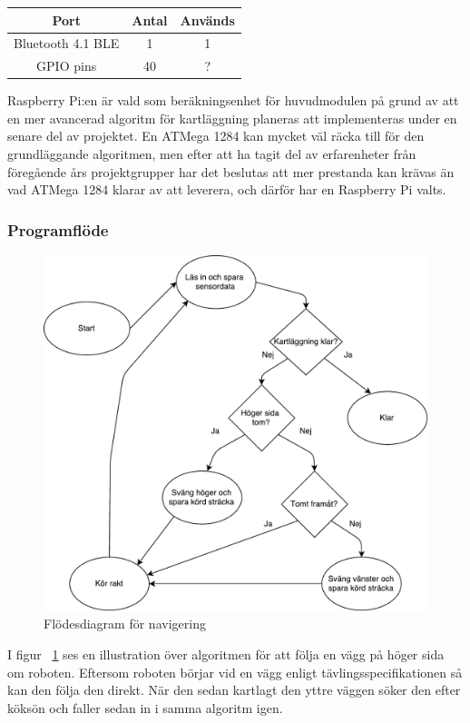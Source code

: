 \documentclass{article}
\begin{document}
\begin{table}[H]
   \centering
  \begin{tabular}{ | c | c | c | }
    \hline
    \textbf{Port} & \textbf{Antal} & \textbf{Används} \\
    \hline
    Bluetooth 4.1 BLE & 1 & 1\\
    GPIO pins & 40 & ? \\
    \hline
  \end{tabular}
\end{table}

Raspberry Pi:en är vald som beräkningsenhet för huvudmodulen på grund av att en mer avancerad algoritm för kartläggning planeras att implementeras under en senare del av projektet. En ATMega 1284 kan mycket väl räcka till för den grundläggande algoritmen, men efter att ha tagit del av erfarenheter från föregående års projektgrupper har det beslutas att mer prestanda kan krävas än vad ATMega 1284 klarar av att leverera, och därför har en Raspberry Pi valts. 

\subsubsection{Programflöde}
\begin{figure}[H]
\centering
\includegraphics[scale=0.6]{navigering_flowchart}
\caption{Flödesdiagram för navigering}
\label{fig:navigering_flowchart}
\end{figure}
I figur ~\ref{fig:navigering_flowchart} ses en illustration över algoritmen för att följa en vägg på höger sida om roboten. Eftersom roboten börjar vid en vägg enligt tävlingsspecifikationen så kan den följa den direkt. När den sedan kartlagt den yttre väggen söker den efter köksön och faller sedan in i samma algoritm igen.
\end{document}
